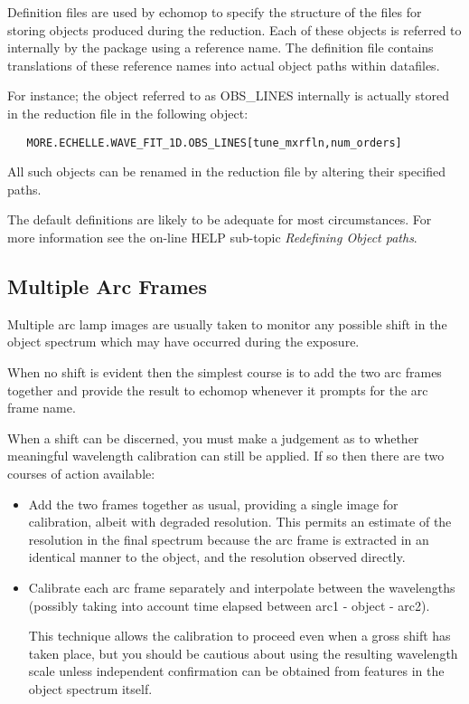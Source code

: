 Definition files are used by {\sc echomop} to specify the structure of the
files for storing objects produced during the reduction.
Each of these objects is referred to internally by the package using a
reference name.  The definition file contains translations of these
reference names into actual object paths within datafiles.

For instance; the object referred to as OBS\_LINES internally is
actually stored in the reduction file in the following object:

\begin{verbatim}
   MORE.ECHELLE.WAVE_FIT_1D.OBS_LINES[tune_mxrfln,num_orders]
\end{verbatim}

All such objects can be renamed in the reduction file by altering their
specified paths.

The default definitions are likely to be adequate for most
circumstances.  For more information see the on-line HELP sub-topic
{\sl Redefining Object paths}.

\subsection{Multiple Arc Frames}

Multiple arc lamp images are usually taken to monitor any possible shift
in the object spectrum which may have occurred during the exposure.

When no shift is evident then the simplest course is to add the two arc
frames together and provide the result to {\sc echomop} whenever it
prompts for the arc frame name.

When a shift can be discerned, you must make a judgement as to
whether meaningful wavelength calibration can still be applied. If so
then there are two courses of action available:

\begin{itemize}

\item Add the two frames together as usual, providing a single image for
calibration, albeit with degraded resolution. This permits an  estimate
of the resolution in the final spectrum because the arc frame is
extracted in an identical manner to the object,  and the resolution
observed directly.

\item Calibrate each arc frame separately and interpolate between the
wavelengths (possibly taking into account time elapsed between arc1 -
object - arc2).

This technique allows the calibration to proceed even when a gross shift
has taken place, but you should be cautious about using the resulting
wavelength scale unless independent confirmation can be obtained from
features in the object spectrum itself.

\end{itemize}

